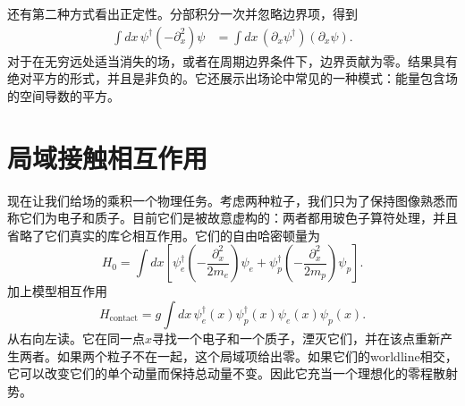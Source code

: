 \begin{classroomqa}
\end{classroomqa}

\begin{classroomqa}
\end{classroomqa}

\begin{classroomqa}
\end{classroomqa}

还有第二种方式看出正定性。分部积分一次并忽略边界项，得到
\begin{align}
\int dx\,\psi^\dagger(-\partial_x^2)\psi
&=\int dx\,(\partial_x\psi^\dagger)(\partial_x\psi).
\label{eq:l9-positive-kinetic}
\end{align}
对于在无穷远处适当消失的场，或者在周期边界条件下，边界贡献为零。结果具有绝对平方的形式，并且是非负的。它还展示出场论中常见的一种模式：能量包含场的空间导数的平方。

\section{局域接触相互作用}

现在让我们给场的乘积一个物理任务。考虑两种粒子，我们只为了保持图像熟悉而称它们为电子和质子。目前它们是被故意虚构的：两者都用玻色子算符处理，并且省略了它们真实的库仑相互作用。它们的自由哈密顿量为
\begin{equation}
H_0=\int dx\left[
\psi_e^\dagger\left(-\frac{\partial_x^2}{2m_e}\right)\psi_e
+
\psi_p^\dagger\left(-\frac{\partial_x^2}{2m_p}\right)\psi_p
\right].
\end{equation}
加上模型相互作用
\begin{equation}
H_{\mathrm{contact}}
=g\int dx\,
\psi_e^\dagger(x)\psi_p^\dagger(x)
\psi_e(x)\psi_p(x).
\label{eq:l9-contact}
\end{equation}
从右向左读。它在同一点\(x\)寻找一个电子和一个质子，湮灭它们，并在该点重新产生两者。如果两个粒子不在一起，这个局域项给出零。如果它们的worldline相交，它可以改变它们的单个动量而保持总动量不变。因此它充当一个理想化的零程散射势。

